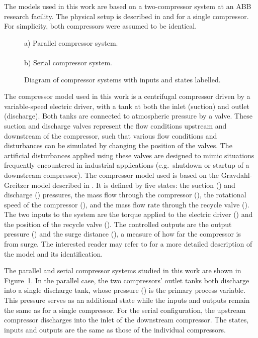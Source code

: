 \label{sec:modelling}
The models used in this work are based on a two-compressor system at an ABB research facility.
The physical setup is described in \cite{Cortinovis2014} and \cite{Cortinovis2015} for a single compressor.
For simplicity, both compressors were assumed to be identical.

\begin{figure}
    
    {\centering a) Parallel compressor system.\\}
    \\
    {\centering b) Serial compressor system.\\}
  \caption[Diagram of compressor systems.]{Diagram of compressor systems with inputs and states labelled.}
  \label{fig:comp-systems-diagrams}
\end{figure}


The compressor model used in this work is a centrifugal compressor driven by a variable-speed electric driver, with a tank at both the inlet (suction) and outlet (discharge).
Both tanks are connected to atmospheric pressure by a valve.
These suction and discharge valves represent the flow conditions upstream and downstream of the compressor, such that various flow conditions and disturbances can be simulated by changing the position of the valves.
The artificial disturbances applied using these valves are designed to mimic situations frequently encountered in industrial applications (e.g.\ shutdown or startup of a downstream compressor).
The compressor model used is based on the Gravdahl-Greitzer model described in \cite{Gravdahl1999}. 
It is defined by five states: the suction () and discharge () pressures, the mass flow through the compressor (), the rotational speed of the compressor (), and the mass flow rate through the recycle valve ().
The two inputs to the system are the torque applied to the electric driver () and the position of the recycle valve ().
The controlled outputs are the output pressure () and the surge distance (), a measure of how far the compressor is from surge.
The interested reader may refer to \cite{Cortinovis2015} for a more detailed description of the model and its identification.

The parallel and serial compressor systems studied in this work are shown in Figure~\ref{fig:comp-systems-diagrams}.
In the parallel case, the two compressors' outlet tanks both discharge into a single discharge tank, whose pressure () is the primary process variable.
This pressure serves as an additional state while the inputs and outputs remain the same as for a single compressor.
For the serial configuration, the upstream compressor discharges into the inlet of the downstream compressor.
The states, inputs and outputs are the same as those of the individual compressors.
